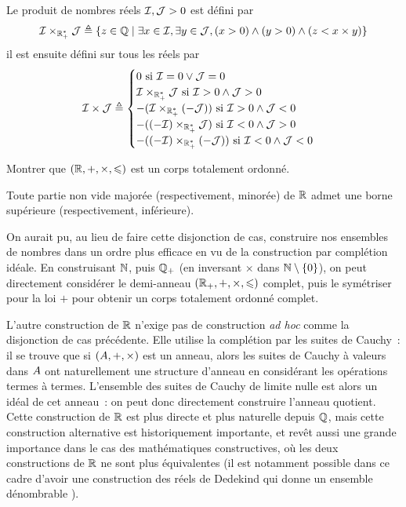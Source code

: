 \begin{definition}
  Le produit de nombres réels $\mathcal{I},\mathcal{J} > 0$ est défini par
  \[\mathcal{I}\times_{\mathbb R_+^*}\mathcal{J}\triangleq
  \left\{ z \in \mathbb Q \;\middle\vert\; \exists x \in \mathcal{I}, \exists y \in \mathcal{J},
    (x > 0) \land (y > 0) \land (z < x \times y) \right\}\]
  il est ensuite défini sur tous les réels par
  \[\mathcal{I} \times \mathcal{J} \triangleq \begin{cases}
  0 \text{ si } \mathcal{I} = 0 \lor \mathcal{J} = 0 \\
  \mathcal{I} \times_{\mathbb R_+^*} \mathcal{J} \text{ si } \mathcal{I} > 0 \land \mathcal{J} > 0\\
  - (\mathcal{I} \times_{\mathbb R_+^*} (-\mathcal{J})) \text{ si }
  \mathcal{I} > 0 \land \mathcal{J} < 0\\
  - ((-\mathcal{I}) \times_{\mathbb R_+^*} \mathcal{J}) \text{ si }
  \mathcal{I} < 0 \land \mathcal{J} > 0\\
  - ((-\mathcal{I}) \times_{\mathbb R_+^*} (-\mathcal{J})) \text{ si }
  \mathcal{I} < 0 \land \mathcal{J} < 0
  \end{cases}\]
\end{definition}

\begin{exercise}
  Montrer que $(\mathbb R,+,\times,\leqslant)$ est un corps totalement ordonné.
\end{exercise}

\begin{corollary}
  Toute partie non vide majorée (respectivement, minorée) de $\mathbb R$ admet
  une borne supérieure (respectivement, inférieure).
\end{corollary}

\begin{remark}
  On aurait pu, au lieu de faire cette disjonction de cas, construire nos
  ensembles de nombres dans un ordre plus efficace en vu de la construction par
  complétion idéale. En construisant $\mathbb N$, puis $\mathbb Q_+$ (en
  inversant $\times$ dans $\mathbb N\setminus\{0\}$), on peut directement considérer
  le demi-anneau $(\mathbb R_+,+,\times,\leqslant)$ complet, puis le symétriser pour la
  loi $+$ pour obtenir un corps totalement ordonné complet.
\end{remark}

\begin{remark}
  L'autre construction de $\mathbb R$ n'exige pas de construction
  \textit{ad hoc} comme la disjonction de cas précédente. Elle utilise la
  complétion par les suites de Cauchy~: il se trouve que si $(A,+,\times)$
  est un anneau, alors les suites de Cauchy à valeurs dans $A$ ont
  naturellement une structure d'anneau en considérant les opérations termes à
  termes. L'ensemble des suites de Cauchy de limite nulle est alors un idéal de
  cet anneau~: on peut donc directement construire l'anneau quotient. Cette
  construction de $\mathbb R$ est plus directe et plus naturelle depuis $\mathbb Q$, mais
  cette construction alternative est historiquement importante, et revêt aussi
  une grande importance dans le cas des mathématiques constructives, où les
  deux constructions de $\mathbb R$ ne sont plus équivalentes (il est notamment
  possible dans ce cadre d'avoir une construction des réels de Dedekind qui
  donne un ensemble dénombrable \cite{BauerHanson2026}).
\end{remark}

